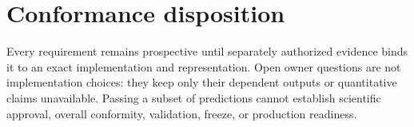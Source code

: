\documentclass[10pt]{article}
\begin{document}
\tableofcontents
\newpage








\section*{Conformance disposition}

Every requirement remains prospective until separately authorized evidence
binds it to an exact implementation and representation.  Open owner questions
are not implementation choices: they keep only their dependent outputs or
quantitative claims unavailable.  Passing a subset of predictions cannot
establish scientific approval, overall conformity, validation, freeze, or
production readiness.
\end{document}
